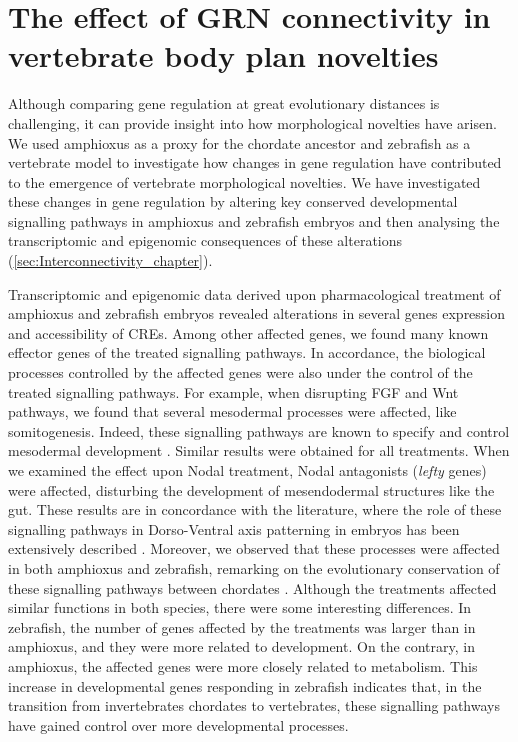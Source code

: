 \chapter{The effect of GRN connectivity in vertebrate body plan novelties}


Although comparing gene regulation at great evolutionary distances is challenging, it can provide insight into how morphological novelties have arisen. We used amphioxus as a proxy for the chordate ancestor and zebrafish as a vertebrate model to investigate how changes in gene regulation have contributed to the emergence of vertebrate morphological novelties. We have investigated these changes in gene regulation by altering key conserved developmental signalling pathways in amphioxus and zebrafish embryos and then analysing the transcriptomic and epigenomic consequences of these alterations (\ref{sec:Interconnectivity_chapter}). 


Transcriptomic and epigenomic data derived upon pharmacological treatment of amphioxus and zebrafish embryos revealed alterations in several genes expression and accessibility of CREs. Among other affected genes, we found many known effector genes of the treated signalling pathways. In accordance, the biological processes controlled by the affected genes were also under the control of the treated signalling pathways. For example, when disrupting FGF and Wnt pathways, we found that several mesodermal processes were affected, like somitogenesis. Indeed, these signalling pathways are known to specify and control mesodermal development \parencite{kiecker_molecular_2016}. Similar results were obtained for all treatments. When we examined the effect upon Nodal treatment, Nodal antagonists (\textit{lefty} genes) were affected, disturbing the development of mesendodermal structures like the gut. These results are in concordance with the literature, where the role of these signalling pathways in Dorso-Ventral axis patterning in embryos has been extensively described  \parencite{kiecker_molecular_2016, tuazon_temporally_2015}. Moreover, we observed that these processes were affected in both amphioxus and zebrafish, remarking on the evolutionary conservation of these signalling pathways between chordates \parencite{babonis_phylogenetic_2017}. Although the treatments affected similar functions in both species, there were some interesting differences. In zebrafish, the number of genes affected by the treatments was larger than in amphioxus, and they were more related to development. On the contrary, in amphioxus, the affected genes were more closely related to metabolism. This increase in developmental genes responding in zebrafish indicates that, in the transition from invertebrates chordates to vertebrates, these signalling pathways have gained control over more developmental processes. 



